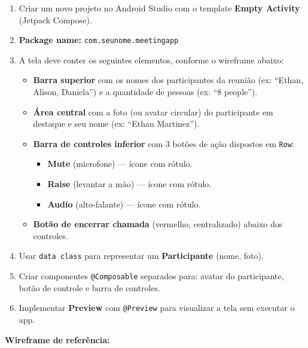 \documentclass[12pt]{article}
\begin{document}
\begin{enumerate}[label=\textbf{\arabic*.}]
  \item Criar um novo projeto no Android Studio com o template \textbf{Empty Activity} (Jetpack Compose).
  \item \textbf{Package name:} \texttt{com.seunome.meetingapp}
  \item A tela deve conter os seguintes elementos, conforme o wireframe abaixo:
  \begin{itemize}
    \item \textbf{Barra superior} com os nomes dos participantes da reunião (ex: ``Ethan, Alison, Daniela'') e a quantidade de pessoas (ex: ``8 people'').
    \item \textbf{Área central} com a foto (ou avatar circular) do participante em destaque e seu nome (ex: ``Ethan Martinez'').
    \item \textbf{Barra de controles inferior} com 3 botões de ação dispostos em \texttt{Row}:
      \begin{itemize}
        \item \textbf{Mute} (microfone) --- ícone com rótulo.
        \item \textbf{Raise} (levantar a mão) --- ícone com rótulo.
        \item \textbf{Audio} (alto-falante) --- ícone com rótulo.
      \end{itemize}
    \item \textbf{Botão de encerrar chamada} (vermelho, centralizado) abaixo dos controles.
  \end{itemize}
  \item Usar \texttt{data class} para representar um \textbf{Participante} (nome, foto).
  \item Criar componentes \texttt{@Composable} separados para: avatar do participante, botão de controle e barra de controles.
  \item Implementar \textbf{Preview} com \texttt{@Preview} para visualizar a tela sem executar o app.
\end{enumerate}

\vspace{0.4cm}
\textbf{Wireframe de referência:}
\end{document}
